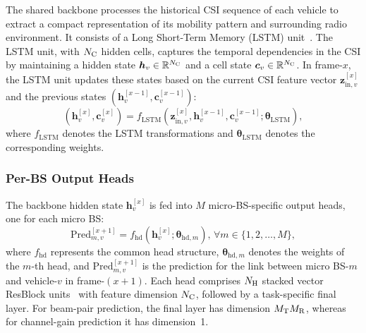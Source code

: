 \documentclass[conference, a4paper]{IEEEtran}
\theoremstyle{remark}
\newtheorem*{remark}{Remark}
\begin{document}
The shared backbone processes the historical CSI sequence of each vehicle to extract a compact representation of its mobility pattern and surrounding radio environment. It consists of a Long Short-Term Memory (LSTM) unit~\cite{lstm}. 
The LSTM unit, with $N_{\rm C}$ hidden cells, captures the temporal dependencies in the CSI by maintaining a hidden state $\bm{h}_v \in \mathbb{R}^{N_{\rm C}}$ and a cell state $\bm{c}_v \in \mathbb{R}^{N_{\rm C}}$. In frame-$x$, the LSTM unit updates these states based on the current CSI feature vector $\bm{z}_{\text{in},v}^{[x]}$ and the previous states $(\bm{h}_v^{[x-1]}, \bm{c}_v^{[x-1]})$:
\begin{equation}
\label{eq:lstm_update}
    \left(\bm{h}_v^{[x]}, \bm{c}_v^{[x]}\right) = f_{\text{LSTM}} \left(\bm{z}_{\text{in},v}^{[x]}, \bm{h}_v^{[x-1]}, \bm{c}_v^{[x-1]} ;\bm{\theta}_{\text{LSTM}} \right),
\end{equation}
where $f_{\text{LSTM}}$ denotes the LSTM transformations and $\bm{\theta}_{\text{LSTM}}$ denotes the corresponding weights. 

\subsubsection{Per-BS Output Heads}
The backbone hidden state $\bm{h}_v^{[x]}$ is fed into $M$ micro-BS-specific output heads, one for each micro BS:
\begin{equation}
\label{eq:OutputHead}
    \text{Pred}_{m,v}^{[x+1]} = f_{\text{hd}} \left(\bm{h}_v^{[x]};\bm{\theta}_{\text{hd},m} \right), \, \forall m \in \{1,2,\dots,M\},
\end{equation}
where $f_{\text{hd}}$ represents the common head structure, 
$\bm{\theta}_{\text{hd},m}$ denotes the weights of the $m$-th head, and $\text{Pred}_{m,v}^{[x+1]}$ is the prediction for the link between micro BS-$m$ and vehicle-$v$ in frame-$(x\!+\!1)$.
Each head comprises $N_{\rm H}$ stacked vector ResBlock units~\cite{He2016} with feature dimension $N_{\rm C}$, followed by a task-specific final layer. For beam-pair prediction, the final layer has dimension $M_{\rm T}M_{\rm R}$, whereas for channel-gain prediction it has dimension~1.
\end{document}
